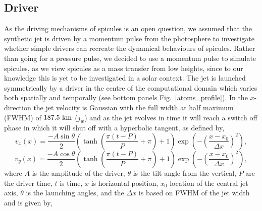 \subsection{Driver}
\label{subsec:driver}
As the driving mechanisms of spicules is an open question, we assumed that the synthetic jet is driven by a momentum pulse from the photosphere to investigate whether simple drivers can recreate the dynamical behaviours of spicules. Rather than going for a pressure pulse, we decided to use a momentum pulse to simulate spicules, as we view spicules as a mass transfer from low heights, since to our knowledge this is yet to be investigated in a solar context. The jet is launched symmetrically by a driver in the centre of the computational domain which varies both spatially and temporally (see bottom panels Fig.~\ref{atoms_profile}). In the $x$-direction the jet velocity is Gaussian with the full width at half maximum (FWHM) of $187.5~\rm{km}$ ($j_w$) and as the jet evolves in time it will reach a switch off phase in which it will shut off with a hyperbolic tangent, as defined by,
\begin{equation}
    v_x(x) = \frac{-A\sin{\theta}}{2}\left( \tanh{\left( \frac{\pi (t-P)}{P}+ \pi \right) +1 } \right) \exp \left( - \left(\frac{x-x_0}{\Delta x} \right)^2  \right),
\end{equation}
\begin{equation}
    v_y(x) = \frac{-A\cos{\theta}}{2}\left( \tanh{\left( \frac{\pi (t-P)}{P}+ \pi \right) +1 } \right) \exp \left( - \left(\frac{x-x_0}{\Delta x} \right)^2  \right),
\end{equation}
where $A$ is the amplitude of the driver, $\theta$ is the tilt angle from the vertical, $P$ are the driver time, $t$ is time, $x$ is horizontal position, $x_0$ location of the central jet axis, $\theta$ is the launching angles, and the $\Delta x$ is based on FWHM of the jet width and is given by,
